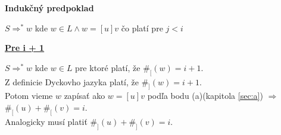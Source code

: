 \documentclass[11pt,a4paper]{article}
\begin{document}
\textbf{Indukčný predpoklad}
\begin{flushright}
\begin{minipage}{0.95\textwidth}
    $S \Rightarrow^{*} w$ kde $w \in L \wedge w = [u]v$ čo platí pre $j < i$\\
\end{minipage}
\end{flushright}


\underline{\textbf{Pre i + 1}}
\begin{flushright}
\begin{minipage}{0.95\textwidth}
    $S \Rightarrow^{*} w$ kde $w \in L$ pre ktoré platí, že $\#_{[}(w)=i+1$.\\
    Z definicie Dyckovho jazyka platí, že $\#_{]}(w)=i+1$.\\
    Potom vieme $w$ zapísať ako $w=[u]v$ podľa bodu (a)(kapitola \ref{sec:a}) $\Longrightarrow$ $\#_{[}(u) + \#_{[}(v) = i$.\\
    Analogicky musí platiť $\#_{]}(u) + \#_{]}(v) = i$.
\end{minipage}
\end{flushright}
\end{document}
